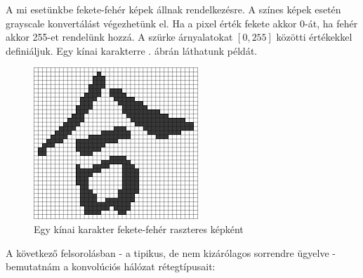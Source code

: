 A mi esetünkbe fekete-fehér képek állnak rendelkezésre. A színes képek esetén grayscale konvertálást végezhetünk el. Ha a pixel érték fekete akkor 0-át, ha fehér akkor 255-et rendelünk hozzá. A szürke árnyalatokat $[0, 255]$ közötti értékekkel definiáljuk. Egy kínai karakterre . ábrán láthatunk példát.

\begin{figure}[h]
\centering
\includegraphics[scale=0.65]{images/chinese_char_pixel}
\caption{Egy kínai karakter fekete-fehér raszteres képként}
\label{fig:chinese_char_pixel}
\end{figure}

A következő felsorolásban - a tipikus, de nem kizárólagos sorrendre ügyelve - bemutatnám a konvolúciós hálózat rétegtípusait:

